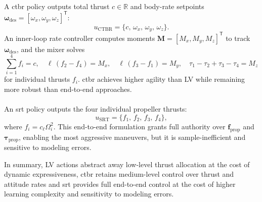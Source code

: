 \paragraph{}  
A \gls{ctbr} policy outputs total thrust \(c\in\mathbb{R}\) and body-rate setpoints \(\boldsymbol{\omega}_{\mathrm{des}}=[\omega_x,\omega_y,\omega_z]^\mathsf{T}\):
\begin{equation}
u_{\mathrm{CTBR}} = \{c,\,\omega_x,\,\omega_y,\,\omega_z\}.
\end{equation}
An inner-loop rate controller computes moments \(\mathbf{M}=[M_x,M_y,M_z]^\mathsf{T}\) to track \(\boldsymbol{\omega}_{\mathrm{des}}\), and the mixer solves
\begin{equation}
\sum_{i=1}^4 f_i = c, 
\quad
\ell\,(f_2 - f_4) = M_x, 
\quad
\ell\,(f_3 - f_1) = M_y, 
\quad
\tau_1 - \tau_2 + \tau_3 - \tau_4 = M_z
\end{equation}
for individual thrusts \(f_i\). \gls{ctbr} achieves higher agility than LV while remaining more robust than end-to-end approaches.

\paragraph{}
An \gls{srt} policy outputs the four individual propeller thrusts:
\begin{equation}
u_{\mathrm{SRT}} = \{f_1,\,f_2,\,f_3,\,f_4\},
\end{equation}
where \(f_i = c_\ell \Omega_i^2\). This end-to-end formulation grants full authority over \(\mathbf{f}_{\mathrm{prop}}\) and \(\boldsymbol{\tau}_{\mathrm{prop}}\), enabling the most aggressive maneuvers, but it is sample-inefficient and sensitive to modeling errors.

In summary, LV actions abstract away low-level thrust allocation at the cost of dynamic expressiveness, \gls{ctbr} retains medium-level control over thrust and attitude rates and \gls{srt} provides full end-to-end control at the cost of higher learning complexity and sensitivity to modeling errors.
